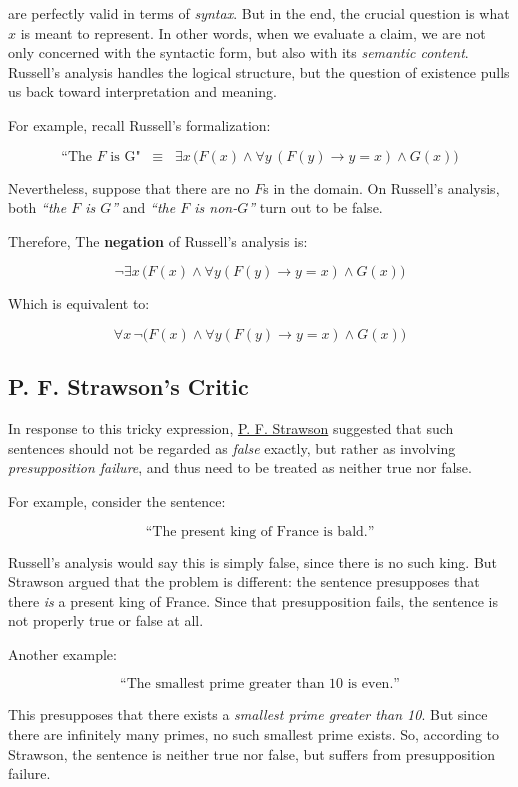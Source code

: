 \documentclass[12pt,a4paper,openany]{article}
\begin{document}
are perfectly valid in terms of \textit{syntax}. But in the end, the crucial question is what $x$ is meant to represent. 
In other words, when we evaluate a claim, we are not only concerned with the syntactic form, but also with its \textit{semantic content}. 
Russell's analysis handles the logical structure, but the question of existence pulls us back toward interpretation and meaning.

For example, recall Russell's formalization:

$$
\text{“The } F \text{ is G"}\;\;\equiv\;\; \exists x \, \big( F(x) \land \forall y \, (F(y) \to y = x) \land G(x) \big)
$$

Nevertheless, suppose that there are no $F$s in the domain. On Russell's analysis, both \textit{“the $F$ is $G$”} and \textit{“the $F$ is non-$G$”} turn out to be false.

Therefore, The \textbf{negation} of Russell's analysis is:

$$
\lnot \exists x \, \big( F(x) \land \forall y (F(y) \to y = x) \land G(x) \big)
$$

Which is equivalent to:

$$
\forall x \, \lnot \big( F(x) \land \forall y (F(y) \to y = x) \land G(x) \big)
$$


\subsection{P. F. Strawson's Critic}
\label{strawsons-critic}

In response to this tricky expression, \href{https://en.wikipedia.org/wiki/P._F._Strawson}{P. F. Strawson} suggested that such sentences should not be regarded as \textit{false} exactly, but rather as involving \textit{presupposition failure}, and thus need to be treated as neither true nor false.

For example, consider the sentence:

$$\text{“The present king of France is bald.”}$$

Russell's analysis would say this is simply false, since there is no such king. 
But Strawson argued that the problem is different: the sentence presupposes that there \textit{is} a present king of France. 
Since that presupposition fails, the sentence is not properly true or false at all.

Another example:

$$\text{“The smallest prime greater than 10 is even.”}$$

This presupposes that there exists a \textit{smallest prime greater than 10}. But since there are infinitely many primes, no such smallest prime exists. So, according to Strawson, the sentence is neither true nor false, but suffers from presupposition failure.
\end{document}
